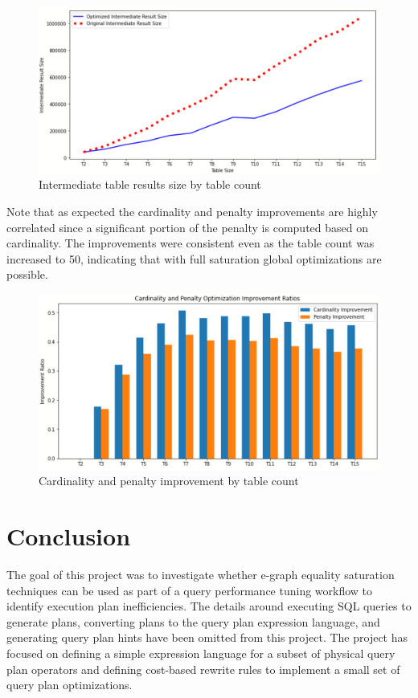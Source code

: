 \documentclass{article}
\begin{document}
\begin{figure}[H]
\centering
\begin{minipage}[b]{0.65\textwidth}
    \includegraphics[width=\textwidth]{result_size.png}
    \caption{Intermediate table results size by table count}
\end{minipage}
\hfill
\end{figure}

Note that as expected the cardinality and penalty improvements are highly correlated since a significant portion of the
penalty is computed based on cardinality.  The improvements were consistent even as the table count was increased to 50, 
indicating that with full saturation global optimizations are possible.

\begin{figure}[H]
\centering
\begin{minipage}[b]{0.65\textwidth}
    \includegraphics[width=\textwidth]{result_percent.png}
    \caption{Cardinality and penalty improvement by table count}
\end{minipage}
\hfill
\end{figure}

\section*{Conclusion}
The goal of this project was to investigate whether e-graph equality saturation techniques can be used as part of a
query performance tuning workflow to identify execution plan inefficiencies.  The details around executing SQL queries
to generate plans, converting plans to the query plan expression language, and generating query plan hints have
been omitted from this project.  The project has focused on defining a simple expression language for a subset of physical query plan
operators and defining cost-based rewrite rules to implement a small set of query plan optimizations.
\end{document}
